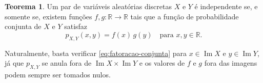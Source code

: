 \documentclass[12pt,portuguese]{article}
\theoremstyle{definition}
\newtheorem{theorem}{Teorema}
\begin{document}
\begin{theorem}\label{thm:fatoracao-conjunta}
Um par de variáveis aleatórias discretas $X$ e $Y$ é independente se, e somente se, existem
funções $f, g : \mathbb{R} \to \mathbb{R}$ tais que a função de probabilidade
conjunta de $X$ e $Y$ satisfaz
\begin{equation}\label{eq:fatoracao-conjunta}
p_{X,Y}(x, y) = f(x)\,g(y) \quad \text{para } x, y \in \mathbb{R}.
\end{equation}
\end{theorem}

Naturalmente, basta verificar \eqref{eq:fatoracao-conjunta} para
$x \in \operatorname{Im}X$ e $y \in \operatorname{Im}Y$, já que $p_{X,Y}$ se anula
fora de $\operatorname{Im}X \times \operatorname{Im}Y$ e os valores de $f$ e $g$
fora das imagens podem sempre ser tomados nulos.
\end{document}
